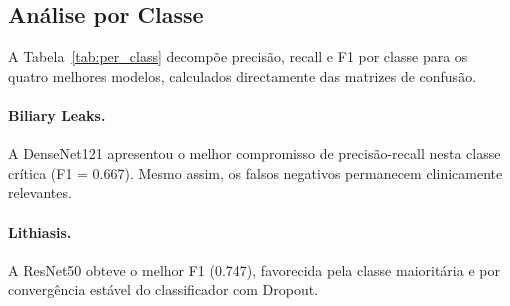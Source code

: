 \documentclass[runningheads]{llncs}
\begin{document}
\subsection{Análise por Classe}

A Tabela~\ref{tab:per_class} decompõe precisão, recall e F1 por classe para
os quatro melhores modelos, calculados directamente das matrizes de confusão.

\begin{table}[ht]
\caption{Precisão (P), Recall (R) e F1 por classe no conjunto de teste.
  Valores em negrito indicam o melhor F1 por célula.}
\label{tab:per_class}
\centering
\small
{}
\normalsize
\end{table}

\paragraph{Biliary Leaks.}
A DenseNet121 apresentou o melhor compromisso de precisão-recall nesta classe
crítica (F1 = 0.667). Mesmo assim, os falsos negativos permanecem clinicamente
relevantes.

\paragraph{Lithiasis.}
A ResNet50 obteve o melhor F1 (0.747), favorecida pela classe maioritária e
por convergência estável do classificador com Dropout.
\end{document}

